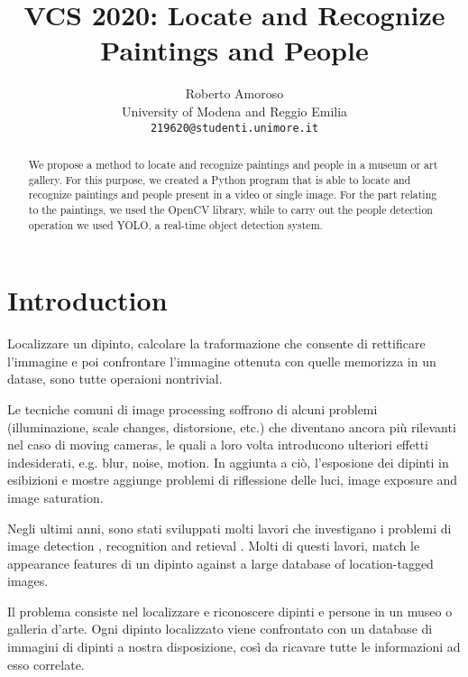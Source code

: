 \documentclass[10pt,twocolumn,letterpaper]{article}
\begin{document}
\title{VCS 2020: Locate and Recognize Paintings and People}

\author{Roberto Amoroso\\
University of Modena and Reggio Emilia\\
{\tt\small 219620@studenti.unimore.it}
}

\maketitle

\begin{abstract}
   We propose a method to locate and recognize paintings and people in a museum or art gallery. For this purpose, we created a Python program that is able to locate and recognize paintings and people present in a video or single image. For the part relating to the paintings, we used the OpenCV library, while to carry out the people detection operation we used YOLO, a real-time object detection system.
\end{abstract}

\section{Introduction}
Localizzare un dipinto, calcolare la traformazione che consente di rettificare l'immagine e poi confrontare l'immagine ottenuta con quelle memorizza in un datase, sono tutte operaioni nontrivial. 

Le tecniche comuni di image processing soffrono di alcuni problemi (illuminazione, scale changes, distorsione, etc.) che diventano ancora più rilevanti nel caso di moving cameras, le quali a loro volta introducono ulteriori effetti indesiderati, e.g. blur, noise, motion. 
In aggiunta a ciò, l'esposione dei dipinti in esibizioni e mostre aggiunge problemi di riflessione delle luci, image exposure and image saturation.

Negli ultimi anni, sono stati sviluppati molti lavori che investigano i problemi di image detection \cite{fathy1995image,hambly2001supercosmos}, recognition \cite{martinel2013robust} and retieval \cite{rui1999image}. Molti di questi lavori, match le appearance features di un dipinto against a large database of location-tagged images.


Il problema consiste nel localizzare e riconoscere dipinti e persone in un museo o galleria d'arte.
Ogni dipinto localizzato viene confrontato con un database di immagini di dipinti a nostra disposizione, così da ricavare tutte le informazioni ad esso correlate.
\end{document}
